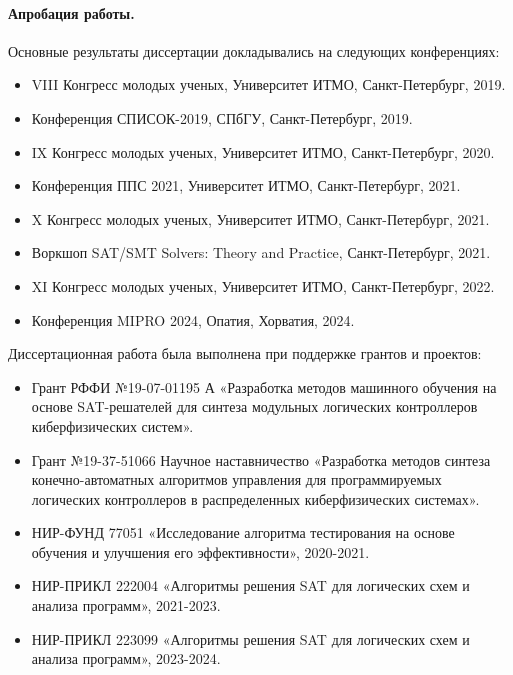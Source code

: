 \paragraph{Апробация работы.}
%
Основные результаты диссертации докладывались на следующих конференциях:
\begin{itemize}[beginpenalty=10000]
    \item VIII Конгресс молодых ученых, Университет ИТМО, Санкт-Петербург, 2019.
    \item Конференция СПИСОК-2019, СПбГУ, Санкт-Петербург, 2019.
    \item IX Конгресс молодых ученых, Университет ИТМО, Санкт-Петербург, 2020.
    \item Конференция ППС 2021, Университет ИТМО, Санкт-Петербург, 2021.
    \item X Конгресс молодых ученых, Университет ИТМО, Санкт-Петербург, 2021.
    \item Воркшоп SAT/SMT Solvers: Theory and Practice, Санкт-Петербург, 2021.
    \item XI Конгресс молодых ученых, Университет ИТМО, Санкт-Петербург, 2022.
    \item Конференция MIPRO 2024, Опатия, Хорватия, 2024.
\end{itemize}
%
Диссертационная работа была выполнена при поддержке грантов и проектов:
\begin{itemize}[beginpenalty=10000]
    \item Грант РФФИ №19-07-01195 А «Разработка методов машинного обучения на основе SAT-решателей для синтеза модульных логических контроллеров киберфизических систем».
    \item Грант №19-37-51066 Научное наставничество «Разработка методов синтеза конечно-автоматных алгоритмов управления для программируемых логических контроллеров в распределенных киберфизических системах».
    \item НИР-ФУНД 77051 «Исследование алгоритма тестирования на основе обучения и улучшения его эффективности», 2020-2021.
    \item НИР-ПРИКЛ 222004 «Алгоритмы решения SAT для логических схем и анализа программ», 2021-2023.
    \item НИР-ПРИКЛ 223099 «Алгоритмы решения SAT для логических схем и анализа программ», 2023-2024.
\end{itemize}


%
%
